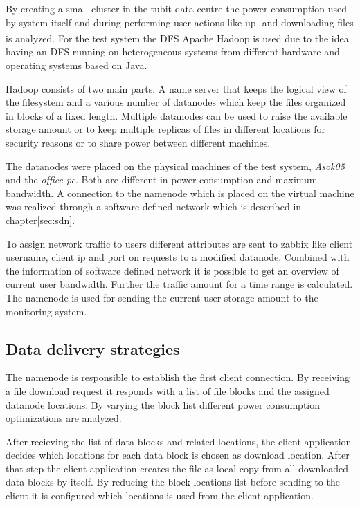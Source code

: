 By creating a small cluster in the tubit data centre the power consumption used by system itself and during performing user actions like up- and downloading files is analyzed. For the test system the DFS Apache Hadoop\textsuperscript{\textregistered} is used due to the idea having an DFS running on heterogeneous systems from different hardware and operating systems based on Java. 

Hadoop consists of two main parts. A name server that keeps the logical view of the filesystem and a various number of datanodes which keep the files organized in blocks of a fixed length. Multiple datanodes can be used to raise the available storage amount or to keep multiple replicas of files in different locations for security reasons or to share power between different machines. 

The datanodes were placed on the physical machines of the test system, \textit{Asok05} and the \textit{office pc}. Both are different in power consumption and maximum bandwidth. A connection to the namenode which is placed on the virtual machine was realized through a software defined network which is described in chapter\ref{sec:sdn}.

To assign network traffic to users different attributes are sent to zabbix like client username, client ip and port on requests to a modified datanode. Combined with the information of software defined network it is possible to get an overview of current user bandwidth. Further the traffic amount for a time range is calculated. The namenode is used for sending the current user storage amount to the monitoring system.

\subsection{Data delivery strategies}

The namenode is responsible to establish the first client connection. By receiving a file download request it responds with a list of file blocks and the assigned datanode locations. By varying the block list different power consumption optimizations are analyzed.

After recieving the list of data blocks and related locations, the client application decides which locations for each data block is chosen as download location. After that step the client application creates the file as local copy from all downloaded data blocks by itself. By reducing the block locations list before sending to the client it is configured which locations is used from the client application.

